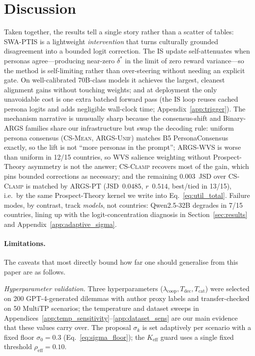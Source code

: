 \documentclass{article}
\begin{document}
\section{Discussion}
\label{sec:discussion}

Taken together, the results tell a single story rather than a scatter of
tables: SWA-PTIS is a lightweight \emph{intervention} that turns culturally
grounded disagreement into a bounded logit correction. The IS update
self-attenuates when personas agree---producing near-zero $\delta^*$ in the
limit of zero reward variance---so the method is self-limiting rather than
over-steering without needing an explicit gate.
On well-calibrated 70B-class models it achieves the largest, cleanest alignment
gains without touching weights; and at deployment the only unavoidable cost is
one extra batched forward pass (the IS loop reuses cached persona logits and
adds negligible wall-clock time; Appendix~\ref{app:trigger}).
The mechanism narrative is unusually sharp because the consensus-shift and
Binary-ARGS families share our infrastructure but swap the decoding rule:
uniform persona consensus (\textsc{CS-Mean}, \textsc{ARGS-Unif}) matches B5
PersonaConsensus exactly, so the lift is not ``more personas in the prompt'';
\textsc{ARGS-WVS} is worse than uniform in 12/15 countries, so WVS salience
weighting without Prospect-Theory asymmetry is not the answer; \textsc{CS-Clamp}
recovers most of the gain, which pins bounded corrections as necessary; and the
remaining $0.003$~JSD over \textsc{CS-Clamp} is matched by \textsc{ARGS-PT}
(JSD~$0.0485$, $r$~$0.514$, best/tied in 13/15), i.e.\ by the same Prospect-Theory
kernel we write into Eq.~\ref{eq:util_total}.
Failure modes, by contrast, track \emph{models}, not countries: Qwen2.5-32B
degrades in 7/15 countries, lining up with the logit-concentration diagnosis in
Section~\ref{sec:results} and Appendix~\ref{app:adaptive_sigma}.

\paragraph{Limitations.}
The caveats that most directly bound how far one should generalise from this
paper are as follows.

\emph{Hyperparameter validation.} Three hyperparameters ($\lambda_{\text{coop}},
T_{\text{dec}}, T_{\text{cat}}$) were selected on 200 GPT-4-generated dilemmas
with author proxy labels and transfer-checked on 50 MultiTP scenarios; the
temperature and dataset sweeps in
Appendices~\ref{app:temp_sensitivity}--\ref{app:dataset_sens} are our main
evidence that these values carry over. The proposal $\sigma_k$ is set adaptively
per scenario with a fixed floor $\sigma_0{=}0.3$ (Eq.~\ref{eq:sigma_floor}); the
$K_{\text{eff}}$ guard uses a single fixed threshold $\rho_{\text{eff}}{=}0.10$.
\end{document}
